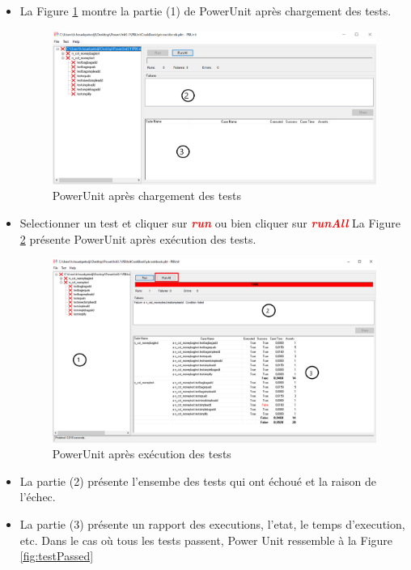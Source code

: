 \documentclass[french]{article}
\theoremstyle{definition}
\begin{document}
\begin{itemize}
  \item  La Figure \ref{fig:afterloadTarget} montre la partie (1) de PowerUnit après chargement des tests.
  \begin{figure}[!htbp]
    \begin{center}
    \includegraphics[width=.8\linewidth]{./afterloadTarget.png}
    \caption{PowerUnit après chargement des tests}
    \label{fig:afterloadTarget}
    \end{center}
  \end{figure}
  \item  Selectionner un test et cliquer sur \textit{\textbf{\textcolor{red}{run}}} ou bien cliquer sur \textit{\textbf{\textcolor{red}{runAll}}}
 La Figure \ref{fig:powerUnitTestRunned} présente PowerUnit après exécution des tests.
  \begin{figure}[!htbp]
    \begin{center}
    \includegraphics[width=.8\linewidth]{./powerUnitTestRunned.png}
    \caption{PowerUnit après exécution des tests}
    \label{fig:powerUnitTestRunned}
    \end{center}
  \end{figure}
  \item  La partie (2) présente l'ensembe des tests qui ont échoué et la raison de l'échec.
  \item La partie (3) présente  un rapport des executions, l'etat, le temps d'execution, etc.
Dans le cas où tous les tests passent, Power Unit ressemble à la Figure \ref{fig:testPassed}

\end{itemize}
\end{document}
